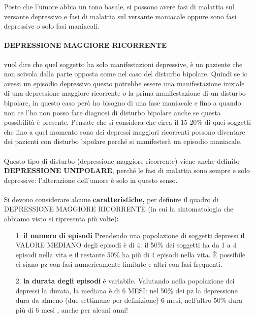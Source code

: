Posto
che l'umore abbia un tono basale, si possono avere fasi di malattia sul
versante depressivo e fasi di malattia sul versante maniacale oppure
sono fasi depressive o solo fasi maniacali.

\paragraph{DEPRESSIONE MAGGIORE RICORRENTE} vuol dire che quel soggetto ha
solo manifestazioni depressive, è un paziente che non scivola dalla
parte opposta come nel caso del disturbo bipolare. Quindi se io avessi
un episodio depressivo questo potrebbe essere una manifestazione
iniziale di una depressione maggiore ricorrente o la prima
manifestazione di un disturbo bipolare, in questo caso però ho bisogno
di una fase maniacale e fino a quando non ce l'ho non posso fare
diagnosi di disturbo bipolare anche se questa possibilità è presente.
Pensate che si considera che circa il 15-20\% di quei soggetti che fino
a quel momento sono dei depressi maggiori ricorrenti possono diventare
dei pazienti con disturbo bipolare perché si manifesterà un episodio
maniacale.
\\\\
Questo tipo di disturbo (depressione maggiore ricorrente) viene anche
definito \textbf{DEPRESSIONE UNIPOLARE}, perché le fasi di malattia sono
sempre e solo depressive: l'alterazione dell'umore è solo in questo
senso.
\\\\
Si devono considerare alcune \textbf{caratteristiche,} per definire il
quadro di DEPRESSIONE MAGGIORE RICORRENTE (in cui la sintomatologia che
abbiamo visto si ripresenta più volte)\textbf{:}

\begin{itemize}
\item[1.]
  \textbf{il numero di episodi} Prendendo una popolazione di soggetti
  depressi il VALORE MEDIANO degli episodi è di 4: il 50\% dei soggetti
  ha da 1 a 4 episodi nella vita e il restante 50\% ha più di 4 episodi
  nella vita. È possibile ci siano pz con fasi numericamente limitate e
  altri con fasi frequenti.
\item[2.]
  \textbf{la durata degli episodi} è variabile. Valutando nella
  popolazione dei depressi la durata, la mediana è di 6 MESI: nel 50\%
  dei pz la depressione dura da almeno (due settimane per definizione) 6
  mesi, nell'altro 50\% dura più di 6 mesi , anche per alcuni anni!
\end{itemize}

